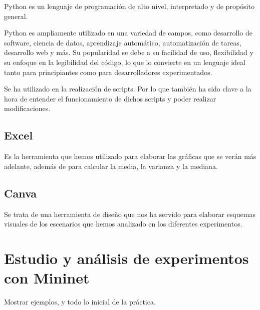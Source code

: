 \documentclass[a4paper, 12pt]{book}
\begin{document}
	Python es un lenguaje de programación de alto nivel, interpretado y de propósito general. 
	
	Python es ampliamente utilizado en una variedad de campos, como desarrollo de software, ciencia de datos, aprendizaje automático, automatización de tareas, desarrollo web y más. Su popularidad se debe a su facilidad de uso, flexibilidad y su enfoque en la legibilidad del código, lo que lo convierte en un lenguaje ideal tanto para principiantes como para desarrolladores experimentados.
	
	Se ha utilizado en la realización de scripts. Por lo que también ha sido clave a la hora de entender el funcionamiento de dichos scripts y poder realizar modificaciones.
	
	\section{Excel} 
	\label{sec:python}
	
	Es la herramienta que hemos utilizado para elaborar las gráficas que se verán más adelante, además de para calcular la media, la varianza y la mediana.
	
	
	\section{Canva} 
	\label{sec:python}
	
	Se trata de una herramienta de diseño que nos ha servido para elaborar esquemas visuales de los escenarios que hemos analizado en los diferentes experimentos.
	
	\cleardoublepage %
	\chapter{Estudio y análisis de experimentos con Mininet} %
	\label{chap:mininet} %
	Mostrar ejemplos, y todo lo inicial de la práctica.
	
	
	\cleardoublepage %
\end{document}
